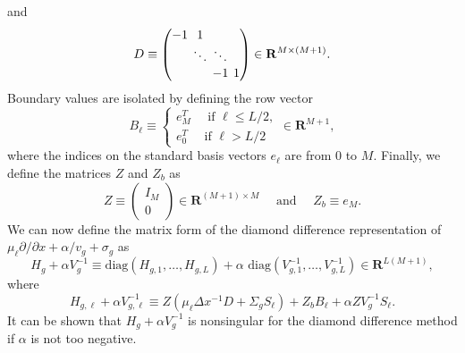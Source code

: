 and
\begin{equation}
D \equiv
\setlength\arraycolsep{2pt}
\begin{pmatrix}
-1 & 1 & & \\
& \ddots & \ddots & \\
& & -1 & 1
\end{pmatrix} \in \mathbf{R}^{M \times (M+1)}.
\end{equation}
Boundary values are isolated by defining the row vector
\begin{equation}
	B_{\ell} \equiv \begin{cases}
				e_{M}^{T} \quad \text{ if } \ell \leq L/2, \\
				e_{0}^{T} \quad \text{ if } \ell > L/2
                              \end{cases} \in \mathbf{R}^{M+1},
\end{equation}
where the indices on the standard basis vectors $e_{\ell}$ are from 0 to $M$. Finally, we define the matrices $Z$ and $Z_{b}$ as
\begin{equation}
	Z \equiv \begin{pmatrix}
			I_{M} \\
			0
		     \end{pmatrix} \in \mathbf{R}^{(M+1) \times M} \quad \text{ and } \quad
	Z_{b} \equiv  e_{M}.
\end{equation}
We can now define the matrix form of the diamond difference representation of  $\mu_{\ell} \partial/\partial x + \alpha/v_{g} + \sigma_{g}$ as 
\begin{equation}
	H_{g} + \alpha V^{-1}_{g} \equiv \text{diag}(H_{g,1}, \dots, H_{g,L}) + \alpha \text{ diag}(V^{-1}_{g,1}, \dots, V^{-1}_{g,L}) \in \mathbf{R}^{L(M+1)},
\end{equation}
where
\begin{equation}
	H_{g,\ell} + \alpha V^{-1}_{g,\ell} \equiv Z(\mu_{\ell}\Delta x^{-1}D + \Sigma_{g}S_{\ell}) + Z_{b}B_{\ell} + \alpha ZV_{g}^{-1}S_{\ell}.
\end{equation}
It can be shown that $H_{g} + \alpha V^{-1}_{g}$ is nonsingular for the diamond difference method if $\alpha$ is not too negative.

